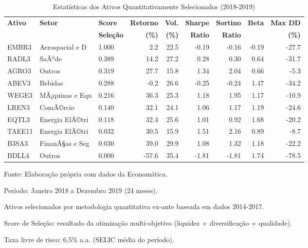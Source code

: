 
\begin{table}[htbp]
\centering
\caption{Estatísticas dos Ativos Quantitativamente Selecionados (2018-2019)}
\label{tab:selected_assets_stats}
\begin{adjustbox}{width=\textwidth}
\begin{tabular}{lllrrrrrr}
\toprule
\textbf{Ativo} & \textbf{Setor} & \textbf{Score} & 
\textbf{Retorno} & \textbf{Vol.} & \textbf{Sharpe} & 
\textbf{Sortino} & \textbf{Beta} & \textbf{Max DD} \\
& & \textbf{Seleção} & \textbf{(\%)} & \textbf{(\%)} & 
\textbf{Ratio} & \textbf{Ratio} & & \textbf{(\%)} \\
\midrule
EMBR3 & Aerospacial e D & 1.000 & 2.2 & 22.5 & -0.19 & -0.16 & -0.19 & -27.7 \\
RADL3 & SaÃºde & 0.389 & 14.2 & 27.2 & 0.28 & 0.30 & 0.64 & -31.7 \\
AGRO3 & Outros & 0.319 & 27.7 & 15.8 & 1.34 & 2.04 & 0.66 & -5.3 \\
ABEV3 & Bebidas & 0.288 & -0.2 & 26.6 & -0.25 & -0.24 & 1.47 & -34.2 \\
WEGE3 & MÃ¡quinas e Equ & 0.216 & 36.3 & 25.3 & 1.18 & 1.95 & 1.17 & -10.9 \\
LREN3 & ComÃ©rcio & 0.140 & 32.1 & 24.1 & 1.06 & 1.17 & 1.19 & -24.6 \\
EQTL3 & Energia ElÃ©tri & 0.118 & 32.4 & 25.6 & 1.01 & 0.92 & 1.68 & -20.2 \\
TAEE11 & Energia ElÃ©tri & 0.032 & 30.5 & 15.9 & 1.51 & 2.16 & 0.89 & -8.7 \\
B3SA3 & FinanÃ§as e Seg & 0.030 & 39.0 & 29.9 & 1.08 & 1.32 & 1.18 & -22.2 \\
BDLL4 & Outros & 0.000 & -57.6 & 35.4 & -1.81 & -1.81 & 1.74 & -78.5 \\
\bottomrule
\end{tabular}
\end{adjustbox}
\begin{tablenotes}
\small
\item Fonte: Elaboração própria com dados da Economática.
\item Período: Janeiro 2018 a Dezembro 2019 (24 meses).
\item Ativos selecionados por metodologia quantitativa ex-ante baseada em dados 2014-2017.
\item Score de Seleção: resultado da otimização multi-objetivo (liquidez + diversificação + qualidade).
\item Taxa livre de risco: 6,5\% a.a. (SELIC média do período).
\end{tablenotes}
\end{table}
